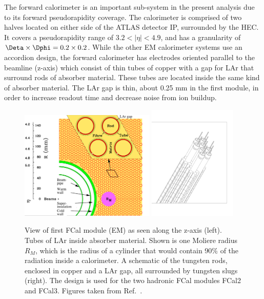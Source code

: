 The forward calorimeter is an important sub-system in the present analysis due to its forward pseudorapidity coverage. The calorimeter is comprised of two halves located on either side of the ATLAS detector IP, surrounded by the HEC. It covers a pseudorapidity range of $3.2<|\eta|<4.9$, and has a granularity of $\Deta\times\Dphi=0.2\times0.2$. While the other EM calorimeter systems use an accordion design, the forward calorimeter has electrodes oriented parallel to the beamline (z-axis) which consist of thin tubes of copper with a gap for LAr that surround rods of absorber material. These tubes are located inside the same kind of absorber material. The LAr gap is thin, about 0.25 mm in the first module, in order to increase readout time and decrease noise from ion buildup.

\begin{figure}
	\centering
	\includegraphics[width=0.575\textwidth]{figures/fcal_2.pdf} %
	\includegraphics[width=0.375\textwidth]{figures/fcal_3.pdf} %
	\caption{ View of first FCal module (EM) as seen along the z-axis (left). Tubes of LAr inside absorber material. Shown is one Moliere radius $R_{M}$, which is the radius of a cylinder that would contain 90\% of the radiation inside a calorimeter. A schematic of the tungsten rods, enclosed in copper and a LAr gap, all surrounded by tungsten slugs (right). The design is used for the two hadronic FCal modules FCal2 and FCal3. Figures taken from Ref.~\cite{Aad:2008zzm}.}	
	\label{fig:fcalcloseup}
\end{figure}

